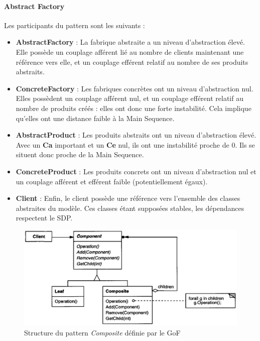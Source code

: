 \documentclass{scrartcl}
\begin{document}
    \paragraph{Abstract Factory}Les participants du pattern sont les suivants : 
    \begin{itemize}
        \item \textbf{AbstractFactory} : La fabrique abstraite a un niveau d'abstraction élevé. Elle possède un couplage afférent lié au nombre de clients maintenant une référence vers elle, et un couplage efférent relatif au nombre de ses produits abstraits.
        \item \textbf{ConcreteFactory} : Les fabriques concrètes ont un niveau d'abstraction nul. Elles possèdent un couplage afférent nul, et un couplage efférent relatif au nombre de produits créés : elles ont donc une forte instabilité. Cela implique qu'elles ont une distance faible à la Main Sequence.
        \item \textbf{AbstractProduct} : Les produits abstraits ont un niveau d'abstraction élevé. Avec un \textbf{Ca} important et un \textbf{Ce} nul, ils ont une instabilité proche de 0. Ils se situent donc proche de la Main Sequence.
        \item \textbf{ConcreteProduct} : Les produits concrets ont un niveau d'abstraction nul et un couplage afférent et efférent faible (potentiellement égaux).
        \item \textbf{Client} : Enfin, le client possède une référence vers l'ensemble des classes abstraites du modèle. Ces classes étant supposées stables, les dépendances respectent le SDP.
    \end{itemize}
    
    \begin{figure}[H]
        \centering
        \includegraphics[scale=0.35]{img/pattern/composite.png}
        \caption{Structure du pattern \emph{Composite} définie par le GoF}
    \end{figure}
\end{document}
